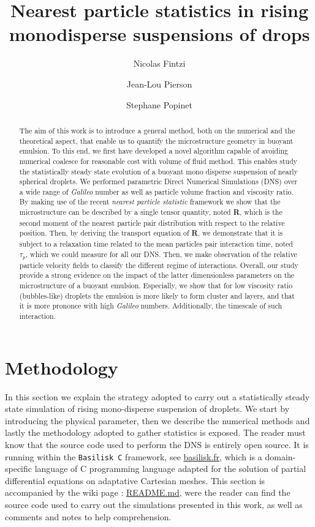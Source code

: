 \documentclass[11pt]{My_preprint}
\title{Nearest particle statistics in rising monodisperse suspensions of drops}
\author[1,2]{Nicolas Fintzi}
\author[1]{Jean-Lou Pierson}
\author[2]{Stephane Popinet}
\affil[1]{IFP Energies Nouvelles, Rond-point de l’echangeur de Solaize, 69360 Solaize}
\affil[2]{Sorbonne Universit\'e, Institut Jean le Rond d’Alembert, 4 place Jussieu, 75252 PARIS CEDEX 05, France}
\begin{document}
\maketitle

\begin{abstract}
    The aim of this work is to introduce a general method, both on the numerical and the theoretical aspect, that enable us to quantify the microstructure geometry in buoyant emulsion. 
    To this end, we first have developed a novel algorithm capable of avoiding numerical coalesce for reasonable cost with volume of fluid method. 
    This enables study the statistically steady state evolution of a buoyant mono disperse suspension of nearly spherical droplets. 
    We performed parametric Direct Numerical Simulations (DNS) over a wide range of \textit{Galileo} number as well as particle volume fraction and viscosity ratio. 
    By making use of the recent \textit{nearest particle statistic} framework  \citep{zhang2021ensemble,zhang2023evolution} we show that the microstructure can be described by a single tensor quantity, noted \textbf{R}, which is the second moment of the nearest particle pair distribution with respect to the relative position. 
    Then, by deriving the transport equation of \textbf{R}, we demonstrate that it is subject to a relaxation time related to the mean particles pair interaction time, noted $\tau_p$, which we could measure for all our DNS.
    Then, we make observation of the relative particle velocity fields to classify the different regime of interactions. 
    Overall, our study provide a strong evidence on the impact of the latter dimensionless parameters on the  microstructure of a buoyant emulsion. 
    Especially, we show that for low viscosity ratio (bubbles-like) droplets the emulsion is more likely to form cluster and layers, and that it is more prononce with high \textit{Galileo} numbers.
    Additionally, the timescale of such interaction.
\end{abstract}



\section{Methodology}

In this section we explain the strategy adopted to carry out a statistically steady state simulation of rising mono-disperse suspension of droplets. 
We start by introducing the physical parameter, then we describe the numerical methods and lastly the methodology adopted to gather statistics is exposed.
The reader must know that the source code used to perform the DNS is entirely open source.
It is running within the \texttt{Basilisk C} framework, see \href{http://basilisk.fr}{basilisk.fr}, which is a domain-specific language of C programming language adapted for the solution of partial differential equations on adaptative Cartesian meshes. 
This section is accompanied by the wiki page : \href{http://basilisk.fr/sandbox/fintzin/Rising-Suspenion/README.md}{README.md}, were the reader can find the source code used to carry out the simulations presented in this work, as well as comments and notes to help comprehension. 
\end{document}
